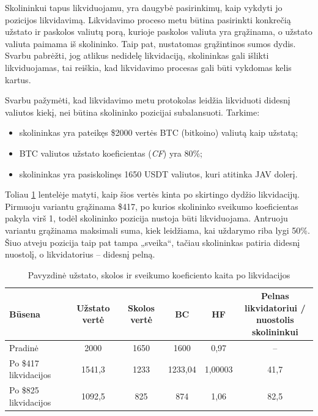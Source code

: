 \documentclass[]{VUMIFTemplateClass}
\begin{document}
Skolininkui tapus likviduojamu, yra daugybė pasirinkimų, kaip vykdyti jo pozicijos likvidavimą. Likvidavimo proceso metu būtina pasirinkti konkrečią užstato ir paskolos valiutų porą, kurioje paskolos valiuta yra grąžinama, o užstato valiuta paimama iš skolininko. Taip pat, nustatomas grąžintinos sumos dydis. Svarbu pabrėžti, jog atlikus nedidelę likvidaciją, skolininkas gali išlikti likviduojamas, tai reiškia, kad likvidavimo procesas gali būti vykdomas kelis kartus.

Svarbu pažymėti, kad likvidavimo metu protokolas leidžia likviduoti didesnį valiutos kiekį, nei būtina skolininko pozicijai subalansuoti. Tarkime:
\begin{itemize}
  \item skolininkas yra pateikęs \$2000 vertės BTC (bitkoino) valiutą kaip užstatą;
  \item BTC valiutos užstato koeficientas (\textit{CF}) yra 80\%;
  \item skolininkas yra pasiskolinęs 1650 USDT valiutos, kuri atitinka JAV dolerį.
\end{itemize}

Toliau \ref{tab:likvidacijos_pav} lentelėje matyti, kaip šios vertės kinta po skirtingo dydžio likvidacijų.
Pirmuoju variantu grąžinama \$417, po kurios skolininko sveikumo koeficientas pakyla virš 1, todėl
skolininko pozicija nustoja būti likviduojama.
Antruoju variantu grąžinama maksimali suma, kiek leidžiama, kai uždarymo riba lygi 50\%.
Šiuo atveju pozicija taip pat tampa „sveika“, tačiau skolininkas patiria didesnį nuostolį, o likvidatorius – didesnį pelną.

\begin{table}[h!]
  \centering
  \begin{tabular}{lccccc}
  \hline
  \textbf{Būsena} 
  & \textbf{Užstato vertė}
  & \textbf{Skolos vertė}
  & \textbf{BC}
  & \textbf{HF}
  & \makecell{\textbf{Pelnas likvidatoriui /}\\ \textbf{nuostolis skolininkui}} \\ 
  \hline
  Pradinė                
  & 2000      
  & 1650      
  & 1600      
  & 0,97    
  & --         \\
  
  Po \$417 likvidacijos  
  & 1541,3    
  & 1233      
  & 1233,04   
  & 1,00003   
  & 41,7       \\
  
  Po \$825 likvidacijos  
  & 1092,5    
  & 825       
  & 874       
  & 1,06      
  & 82,5       \\
  \hline
  \end{tabular}
  \caption{Pavyzdinė užstato, skolos ir sveikumo koeficiento kaita po likvidacijos}
  \label{tab:likvidacijos_pav}
  \end{table}
\end{document}
